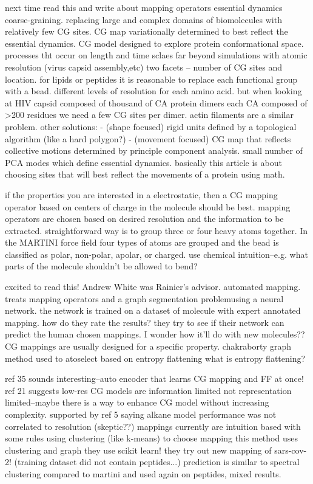 \documentclass{article}
\begin{document}
\cite{Zhang2008}

next time read this and write about mapping operators
essential dynamics coarse-graining. replacing large and complex domains of biomolecules with relatively few CG sites. CG map variationally determined to best reflect the essential dynamics. CG model designed to explore protein conformational space.
processes tht occur on length and time sclaes far beyond simulations with atomic resolution (virus capsid assembly,etc) 
two facets -- number of CG sites and location. for lipids or peptides it is reasonable to replace each functional group with a bead. different levels of resolution for each amino acid. but when looking at HIV capsid composed of thousand of CA protein dimers each CA composed of >200 residues we need a few CG sites per dimer. actin filaments are a similar problem. 
other solutions: 
- (shape focused) rigid units defined by a topological algorithm (like a hard polygon?)  
- (movement focused) CG map that reflects collective motions determined by principle component analysis. small number of PCA modes which define essential dynamics. basically this article is about choosing sites that will best reflect the movements of a protein using math.


\cite{Cao2015a}
if the properties you are interested in a electrostatic, then a CG mapping operator based on centers of charge in the molecule should be best.
mapping operators are chosen based on desired resolution and the information to be extracted. straightforward way is to group three or four heavy atoms together. In the MARTINI force field four types of atoms are grouped and the bead is classified as polar, non-polar, apolar, or charged. 
use chemical intuition--e.g. what parts of the molecule shouldn't be allowed to bend?

\cite{li2020}
excited to read this! Andrew White was Rainier's advisor.
automated mapping. treats mapping operators and a graph segmentation problemusing a neural network. the network is trained on a dataset of molecule with expert annotated mapping. 
how do they rate the results?
they try to see if their network can predict the human chosen mappings. I wonder how it'll do with new molecules?? CG mappings are usually designed for a specific property.
chakraborty graph method used to atoselect based on entropy flattening
what is entropy flattening?

ref 35 sounds interesting--auto encoder that learns CG mapping and FF at once!
ref 21 suggests low-res CG models are information limited not representation limited--maybe there is a way to enhance CG model without increasing complexity. supported by ref 5 saying alkane model performance was not correlated to resolution (skeptic??)
mappings currently are intuition based with some rules
using clustering (like k-means) to choose mapping
this method uses clustering and graph
they use scikit learn!
they try out new mapping of sars-cov-2! (training dataset did not contain peptides...) prediction is similar to spectral clustering
compared to martini and used again on peptides, mixed results.
\end{document}
